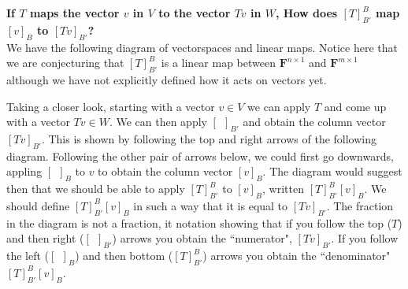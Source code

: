 \documentclass{article}
\theoremstyle{problemstyle}
\begin{document}

\textbf{
If $T$ maps the vector $v$ in $V$ to the vector $Tv$ in $W$, How does $[T]_{B'}^B$ map $[v]_B$ to $[Tv]_{B'}$? 
}\\

We have the following diagram of vectorspaces and linear maps. Notice here that we are conjecturing that $[T]^B_{B'}$ is a linear map between $\textbf{F}^{n\times 1}$ and $\textbf{F}^{m\times 1}$ although we have not explicitly defined how it acts on vectors yet. 

\begin{center}
\end{center}

Taking a closer look, starting with a vector $v \in V$ we can apply $T$ and come up with a vector $Tv \in W$. We can then apply $[ \ \ ]_{B'}$ and obtain the column vector $[Tv]_{B'}$. This is shown by following the top and right arrows of the following diagram. Following the other pair of arrows below, we could first go downwards, appling $[ \ \ ]_B$ to $v$ to obtain the column vector $[v]_B$. The diagram would suggest then that we should be able to apply $[T]^B_{B'}$ to $[v]_B$, written $[T]^B_{B'} [v]_B$. We should define $[T]^B_{B'} [v]_B$ in such a way that it is equal to $[Tv]_{B'}$. The fraction in the diagram is not a fraction, it notation showing that if you follow the top ($T$) and then right ($[ \ \ ]_{B'}$) arrows you obtain the ``numerator", $[Tv]_{B'}$. If you follow the left ($[ \ \ ]_B$) and then bottom ($[T]^B_{B'}$) arrows you obtain the ``denominator"  $[T]^B_{B'} [v]_B$. 

\begin{center}
\end{center}
\end{document}
